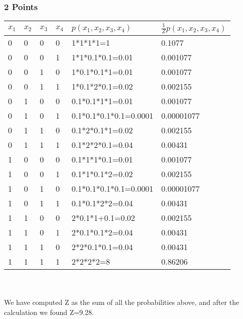 \subsubsection{2 Points}
  \begin{tabular}{ | l | l | l | l | l | l | }
	    \hline
$x_1$ &  $ x_2$  &  $x_3$  &  $x_4$  & $p(x_1,x_2,x_3,x_4)$  & 	$\frac{1 }{Z}p(x_1,x_2,x_3,x_4)$			\\ \hline
0	&   0	 &	0  &  	0   &    1*1*1*1=1              & 	0.1077			\\ \hline
0	&   0	 &	0  & 	1   &    1*1*0.1*0.1=0.01	    & 	0.001077			\\ \hline
0	&   0	 &	1  &	0   &    1*0.1*0.1*1=0.01		& 	0.001077			\\ \hline
0	&   0	 &	1  &	1   &    1*0.1*2*0.1=0.02       & 	0.002155			\\ \hline
0	&   1	 &	0  &	0   &    0.1*0.1*1*1=0.01       & 	0.001077			\\ \hline
0	&   1	 &	0  &	1   &    0.1*0.1*0.1*0.1=0.0001 & 	0.00001077			\\ \hline
0	&   1	 &	1  &	0   &    0.1*2*0.1*1=0.02       & 	0.002155			\\ \hline
0	&   1	 &	1  &	1   &    0.1*2*2*0.1=0.04       & 	0.00431			\\ \hline
1	&   0	 &	0  &	0   &    0.1*1*1*0.1=0.01       & 	0.001077			\\ \hline
1	&   0	 &	0  &	1   &    0.1*1*0.1*2=0.02       & 	0.002155			\\ \hline
1	&   0	 &	1  &	0   &    0.1*0.1*0.1*0.1=0.0001 & 	0.00001077			\\ \hline
1	&   0	 &	1  &	1   &    0.1*0.1*2*2=0.04       & 	0.00431			\\ \hline
1	&   1	 &	0  &	0   &    2*0.1*1+0.1=0.02       & 	0.002155			\\ \hline
1	&   1	 &	0  &	1   &    2*0.1*0.1*2=0.04       & 	0.00431			\\ \hline
1	&   1	 &	1  &	0   &    2*2*0.1*0.1=0.04       & 	0.00431			\\ \hline
1	&   1	 &	1  &	1   &    2*2*2*2=8              & 	0.86206			\\ \hline

  \end{tabular}
\\\\
We have computed Z as the sum of all the probabilities above, and after the calculation we found Z=9.28.
